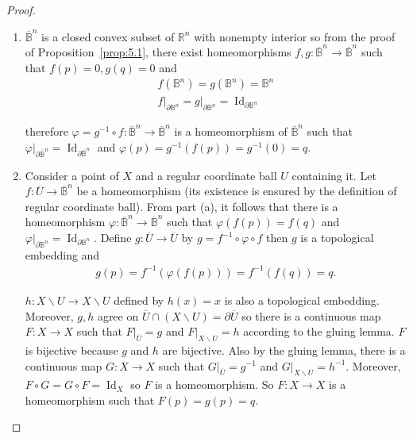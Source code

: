 \begin{proof}
	\begin{enumerate}[label={(\alph*)}]
		\item $\overline{\mathbb{B}}^{n}$ is a closed convex subset of $\mathbb{R}^{n}$ with nonempty interior so from the proof of Proposition~\ref{prop:5.1}, there exist homeomorphisms $f, g: \overline{\mathbb{B}}^{n} \to \overline{\mathbb{B}}^{n}$ such that $f(p) = 0, g(q) = 0$ and
		      \begin{align*}
			      f(\mathbb{B}^{n}) = g(\mathbb{B}^{n}) = \mathbb{B}^{n} \\
			      f\vert_{\partial\mathbb{B}^{n}} = g\vert_{\partial\mathbb{B}^{n}} = \operatorname{Id}_{\partial\mathbb{B}^{n}}
		      \end{align*}

		      therefore $\varphi = g^{-1}\circ f: \overline{\mathbb{B}}^{n} \to \overline{\mathbb{B}}^{n}$ is a homeomorphism of $\overline{\mathbb{B}}^{n}$ such that $\varphi\vert_{\partial\overline{\mathbb{B}}^{n}} = \operatorname{Id}_{\partial\overline{\mathbb{B}}^{n}}$ and $\varphi(p) = g^{-1}(f(p)) = g^{-1}(0) = q$.
		\item Consider a point of $X$ and a regular coordinate ball $U$ containing it. Let $f: \overline{U} \to \overline{\mathbb{B}}^{n}$ be a homeomorphism (its existence is ensured by the definition of regular coordinate ball). From part (a), it follows that there is a homeomorphism $\varphi: \overline{\mathbb{B}}^{n} \to \overline{\mathbb{B}}^{n}$ such that $\varphi(f(p)) = f(q)$ and $\varphi\vert_{\partial\mathbb{B}^{n}} = \operatorname{Id}_{\partial\mathbb{B}^{n}}$. Define $g: \overline{U} \to \overline{U}$ by $g = f^{-1} \circ \varphi \circ f$ then $g$ is a topological embedding and
		      \begin{align*}
			      g(p) = f^{-1}(\varphi(f(p))) = f^{-1}(f(q)) = q.
		      \end{align*}

		      $h: X\smallsetminus U \to X\smallsetminus U$ defined by $h(x) = x$ is also a topological embedding. Moreover, $g, h$ agree on $\overline{U} \cap (X \smallsetminus U) = \partial \overline{U}$ so there is a continuous map $F: X \to X$ such that $F\vert_{\overline{U}} = g$ and $F\vert_{X\smallsetminus U} = h$ according to the gluing lemma. $F$ is bijective because $g$ and $h$ are bijective. Also by the gluing lemma, there is a continuous map $G: X\to X$ such that $G\vert_{\overline{U}} = g^{-1}$ and $G\vert_{X\smallsetminus U} = h^{-1}$. Moreover, $F \circ G = G \circ F = \operatorname{Id}_{X}$ so $F$ is a homeomorphism. So $F: X\to X$ is a homeomorphism such that $F(p) = g(p) = q$.


\end{enumerate}
\end{proof}
